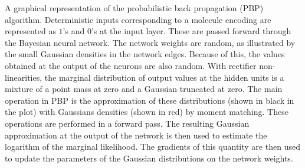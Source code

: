 A graphical representation of the probabilistic back propagation (PBP)
algorithm. Deterministic inputs corresponding to a molecule encoding are represented as $1$'s and $0$'s at the input
layer. These are passed forward through the Bayesian neural network. The network weights are random, as illustrated
by the small Gaussian densities in the network edges. Because of this, the values obtained at the output of the
neurons are also random. With rectifier non-linearities, the marginal distribution of output values at the hidden units is a mixture
of a point mass at zero and a Gaussian truncated at zero. 
The main operation in PBP is the approximation of
these distributions (shown in black in the plot) with Gaussians densities (shown in red) by moment matching. These
operations are performed in a forward pass. The resulting Gaussian
approximation at the output of the network is then used to estimate the
logarithm of the marginal likelihood. The gradients of this quantity are then
used to update the parameters of the Gaussian distributions on the network
weights.
\label{fig:pbp}